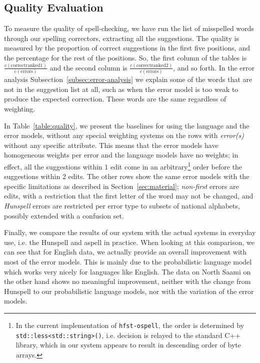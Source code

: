 \documentclass[a4paper,12pt]{article}
\begin{document}
\subsection{Quality Evaluation}
\label{subsec:quality}

To measure the quality of spell-checking, we have run the list of misspelled
words through our spelling correctors, extracting all the suggestions. The
quality is measured by the proportion of correct suggestions in the first
five positions, and the percentage for the rest of the positions. So, the first
column of the tables is $\frac{c(\mathrm{correct ranked
1})}{c(\mathrm{errors})}$ and the second column is $\frac{c(\mathrm{correct
ranked 2})}{c(\mathrm{errors})}$, and so forth. In the error analysis
Subsection~\ref{subsec:error-analysis} we explain some of the words that are
not in the suggestion list at all, such as when the error model is too weak to
produce the expected correction. These words are the same regardless of
weighting.

In Table~\ref{table:quality}, we present the baselines for using the language
and the error models, without any special weighting systems on the rows with
\emph{error(s)} without any specific attribute. This means that the error
models have homogeneous weights per error and the language models have no
weights; in effect, all the suggestions within 1 edit come in an
arbitrary\footnote{In the current implementation of \texttt{hfst-ospell}, the
    order is determined by \texttt{std::less<std::string>()}, i.e. decision is
relayed to the standard C++ library, which in our system appears to result in
descending order of byte arrays.} order before the suggestions within 2 edits.
The other rows show the same error models with the specific limitations as
described in Section~\ref{sec:material}; \emph{non-first} errors are edits, with a restriction that the first letter of the word may not be changed, and
\emph{Hunspell} errors are restricted per error type to subsets of national
alphabets, possibly extended with a confusion set.

Finally, we compare the results of our system with the actual systems in
everyday use, i.e. the Hunspell and aspell in practice. When looking at this
comparison, we can see that for English data, we actually provide an overall
improvement with most of the error models. This is mainly due to the
probabilistic language model which works very nicely for languages like
English. The data on North Saami on the other hand shows no meaningful
improvement, neither with the change from Hunspell to our probabilistic language
models, nor with the variation of the error models.
\end{document}
